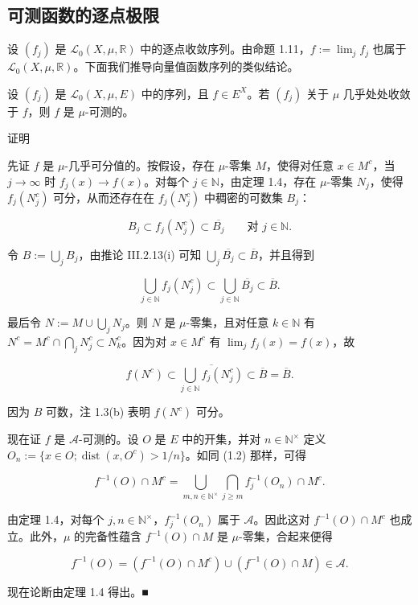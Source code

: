 \subsection*{可测函数的逐点极限}

设 $ (f_j) $ 是 $ \mathcal{L}_0(X,\mu,\mathbb{R}) $ 中的逐点收敛序列。由命题 1.11，$ f := \lim_j f_j $ 也属于 $ \mathcal{L}_0(X,\mu,\mathbb{R}) $。下面我们推导向量值函数序列的类似结论。

\begin{theorem}

设 $ (f_j) $ 是 $ \mathcal{L}_0(X,\mu,E) $ 中的序列，且 $ f \in E^X $。若 $ (f_j) $ 关于 $ \mu $ 几乎处处收敛于 $ f $，则 $ f $ 是 $ \mu $-可测的。

证明

\begin{subitems}
\item

先证 $ f $ 是 $ \mu $-几乎可分值的。按假设，存在 $ \mu $-零集 $ M $，使得对任意 $ x \in M^c $，当 $ j \to \infty $ 时 $ f_j(x) \to f(x) $。对每个 $ j \in \mathbb{N} $，由定理 1.4，存在 $ \mu $-零集 $ N_j $，使得 $ f_j(N_j^c) $ 可分，从而还存在在 $ f_j(N_j^c) $ 中稠密的可数集 $ B_j $：

\[
B_j \subset f_j(N_j^c) \subset \overline{B_j} \qquad \text{对 } j \in \mathbb{N} .
\]

令 $ B := \bigcup_j B_j $，由推论 III.2.13(i) 可知 $ \bigcup_j \overline{B_j} \subset \overline{B} $，并且得到

\[
\bigcup_{j\in\mathbb{N}} f_j(N_j^c) \subset \bigcup_{j\in\mathbb{N}} \overline{B_j} \subset \overline{B} .
\]

最后令 $ N := M \cup \bigcup_j N_j $。则 $ N $ 是 $ \mu $-零集，且对任意 $ k \in \mathbb{N} $ 有 $ N^c = M^c \cap \bigcap_j N_j^c \subset N_k^c $。因为对 $ x \in M^c $ 有 $ \lim_j f_j(x) = f(x) $，故

\[
f(N^c) \subset \overline{\bigcup_{j\in\mathbb{N}} f_j(N_j^c)} \subset \overline{B} = \overline{B} .
\]

因为 $ B $ 可数，注 1.3(b) 表明 $ f(N^c) $ 可分。

\item

现在证 $ f $ 是 $ \mathcal{A} $-可测的。设 $ O $ 是 $ E $ 中的开集，并对 $ n \in \mathbb{N}^\times $ 定义 $ O_n := \{ x \in O ; \operatorname{dist}(x,O^c) > 1/n \} $。如同 (1.2) 那样，可得

\[
f^{-1}(O) \cap M^c = \bigcup_{m,n\in\mathbb{N}^\times} \bigcap_{j\ge m} f_j^{-1}(O_n) \cap M^c .
\]

由定理 1.4，对每个 $ j,n \in \mathbb{N}^\times $，$ f_j^{-1}(O_n) $ 属于 $ \mathcal{A} $。因此这对 $ f^{-1}(O) \cap M^c $ 也成立。此外，$ \mu $ 的完备性蕴含 $ f^{-1}(O) \cap M $ 是 $ \mu $-零集，合起来便得

\[
f^{-1}(O) = (f^{-1}(O)\cap M^c) \cup (f^{-1}(O)\cap M) \in \mathcal{A} .
\]

现在论断由定理 1.4 得出。\nobreak\hspace{0.35em}■

\end{subitems}

\end{theorem}

